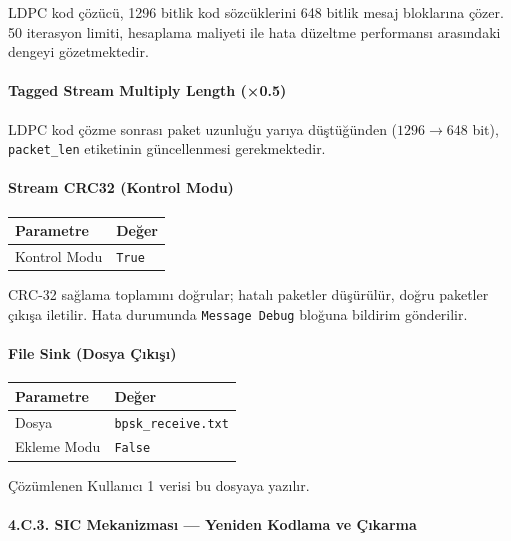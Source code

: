 \documentclass[
]{IEEEtran}
\newcounter{none} %
\begin{document}
LDPC kod çözücü, 1296 bitlik kod sözcüklerini 648 bitlik mesaj
bloklarına çözer. 50 iterasyon limiti, hesaplama maliyeti ile hata
düzeltme performansı arasındaki dengeyi gözetmektedir.

\paragraph{Tagged Stream Multiply Length
(×0.5)}\label{tagged-stream-multiply-length-0.5}

LDPC kod çözme sonrası paket uzunluğu yarıya düştüğünden
(\(1296 \to 648\) bit), \texttt{packet\_len} etiketinin güncellenmesi
gerekmektedir.

\paragraph{Stream CRC32 (Kontrol
Modu)}\label{stream-crc32-kontrol-modu}

{\def\LTcaptype{none} %
\begin{longtable}[]{@{}ll@{}}
\toprule\noalign{}
Parametre & Değer \\
\midrule\noalign{}
\endhead
\bottomrule\noalign{}
\endlastfoot
Kontrol Modu & \texttt{True} \\
\end{longtable}
}

CRC-32 sağlama toplamını doğrular; hatalı paketler düşürülür, doğru
paketler çıkışa iletilir. Hata durumunda \texttt{Message\ Debug} bloğuna
bildirim gönderilir.

\paragraph{File Sink (Dosya
Çıkışı)}\label{file-sink-dosya-uxe7ux131kux131ux15fux131}

{\def\LTcaptype{none} %
\begin{longtable}[]{@{}ll@{}}
\toprule\noalign{}
Parametre & Değer \\
\midrule\noalign{}
\endhead
\bottomrule\noalign{}
\endlastfoot
Dosya & \texttt{bpsk\_receive.txt} \\
Ekleme Modu & \texttt{False} \\
\end{longtable}
}

Çözümlenen Kullanıcı 1 verisi bu dosyaya yazılır.

\paragraph{4.C.3. SIC Mekanizması --- Yeniden Kodlama ve
Çıkarma}\label{c.3.-sic-mekanizmasux131-yeniden-kodlama-ve-uxe7ux131karma}
\end{document}
